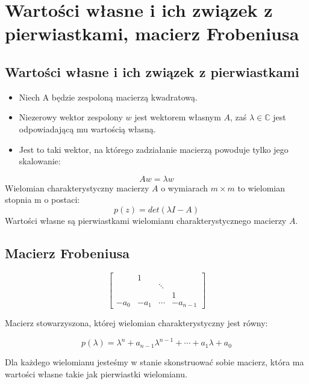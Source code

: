 \documentclass[a4paper]{article}
\begin{document}
\section{Wartości własne i ich związek z pierwiastkami, macierz Frobeniusa}

\subsection{Wartości własne i ich związek z pierwiastkami}
\begin{itemize}
    \item Niech A będzie zespoloną macierzą kwadratową. 
    \item Niezerowy wektor zespolony $w$ jest wektorem własnym $A$, zaś $\lambda \in \mathbb{C}$ jest odpowiadającą mu wartością własną.
    \item Jest to taki wektor, na którego zadziałanie macierzą powoduje tylko jego skalowanie:
\end{itemize}
\begin{equation*}
    Aw= \lambda w
\end{equation*}
Wielomian charakterystyczny macierzy $A$ o wymiarach $m \times m$ to wielomian stopnia m o postaci:
\begin{equation*}
    p(z) = det(\lambda I-A)
\end{equation*}
Wartości własne są pierwiastkami wielomianu charakterystycznego macierzy $A$.

\subsection{Macierz Frobeniusa}
\begin{equation*}
    \begin{bmatrix}
        & 1 & & \\
        & & \ddots & \\
        & & & 1 \\
        -a_0 & -a_1 & \cdots & -a_{n-1}
    \end{bmatrix}
\end{equation*}

Macierz stowarzyszona, której wielomian charakterystyczny jest równy:

\begin{equation*}
    p(\lambda) = \lambda^n + a_{n-1}\lambda^{n-1} + \cdots + a_1\lambda+a_0
\end{equation*}

Dla każdego wielomianu jesteśmy w stanie skonstruować sobie macierz, która ma wartości własne takie jak pierwiastki wielomianu.
\end{document}
